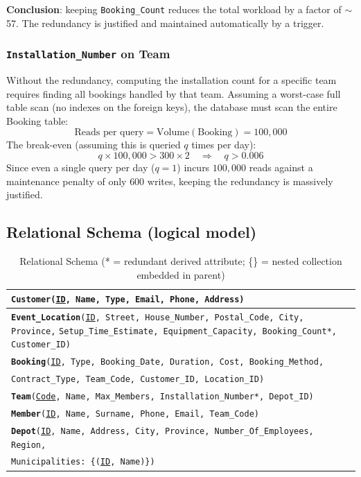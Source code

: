 \documentclass[12pt]{article}
\begin{document}
\noindent \textbf{Conclusion}: keeping \texttt{Booking\_Count} reduces the total workload by a factor
of $\sim$57. The redundancy is justified and maintained automatically by a trigger.

\subsubsection{\texttt{Installation\_Number} on Team}

Without the redundancy, computing the installation count for a specific team requires finding all bookings handled by that team. Assuming a worst-case full table scan (no indexes on the foreign keys), the database must scan the entire Booking table:
\[
  \text{Reads per query} = \text{Volume}(\text{Booking}) = 100{,}000
\]
The break-even (assuming this is queried $q$ times per day):
\[
  q \times 100{,}000 > 300 \times 2 \quad \Rightarrow \quad q > 0.006
\]
Since even a single query per day ($q = 1$) incurs $100{,}000$ reads against a maintenance penalty of only $600$ writes, keeping the redundancy is massively justified.

\subsection{Relational Schema (logical model)}

\begin{table}[H]
  \renewcommand{\arraystretch}{1.4}
  \begin{tabularx}{\textwidth}{|X|}
  \hline
  \texttt{\textbf{Customer}(\underline{ID}, Name, Type, Email, Phone, Address)} \\ \hline
  \texttt{\textbf{Event\_Location}(\underline{ID}, Street, House\_Number, Postal\_Code, City, Province,}
  \texttt{\quad Setup\_Time\_Estimate, Equipment\_Capacity, Booking\_Count*, Customer\_ID)} \\ \hline
  \texttt{\textbf{Booking}(\underline{ID}, Type, Booking\_Date, Duration, Cost, Booking\_Method,}\\
  \texttt{\quad Contract\_Type, Team\_Code, Customer\_ID, Location\_ID)} \\ \hline
  \texttt{\textbf{Team}(\underline{Code}, Name, Max\_Members, Installation\_Number*, Depot\_ID)} \\ \hline
  \texttt{\textbf{Member}(\underline{ID}, Name, Surname, Phone, Email, Team\_Code)} \\ \hline
  \texttt{\textbf{Depot}(\underline{ID}, Name, Address, City, Province, Number\_Of\_Employees, Region,}\\
  \texttt{\quad Municipalities: \{(\underline{ID}, Name)\})} \\ \hline
  \end{tabularx}
  \caption{Relational Schema (* = redundant derived attribute; \{\} = nested collection embedded in parent)}
\end{table}
\end{document}
